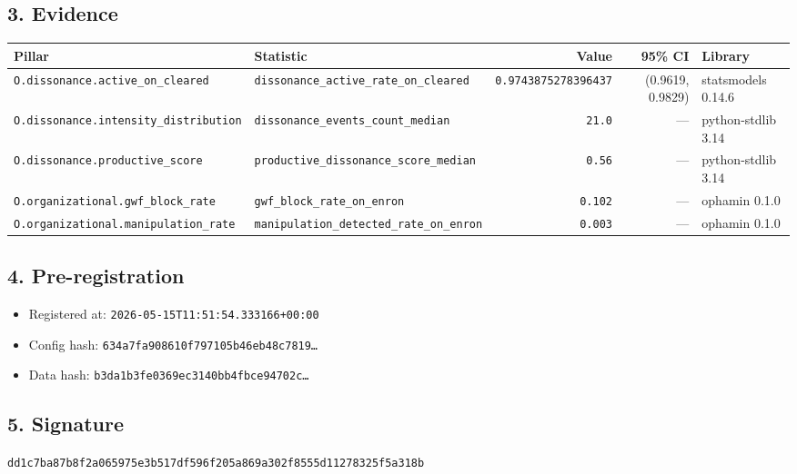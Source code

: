 \documentclass{article}
\begin{document}
\subsection*{3. Evidence}
\begin{tabular}{llrrl}\toprule
\textbf{Pillar} & \textbf{Statistic} & \textbf{Value} & \textbf{95\% CI} & \textbf{Library} \\\midrule
\texttt{O.dissonance.active\_on\_cleared} & \texttt{dissonance\_active\_rate\_on\_cleared} & \texttt{0.9743875278396437} & (0.9619, 0.9829) & statsmodels 0.14.6 \\
\texttt{O.dissonance.intensity\_distribution} & \texttt{dissonance\_events\_count\_median} & \texttt{21.0} & --- & python-stdlib 3.14 \\
\texttt{O.dissonance.productive\_score} & \texttt{productive\_dissonance\_score\_median} & \texttt{0.56} & --- & python-stdlib 3.14 \\
\texttt{O.organizational.gwf\_block\_rate} & \texttt{gwf\_block\_rate\_on\_enron} & \texttt{0.102} & --- & ophamin 0.1.0 \\
\texttt{O.organizational.manipulation\_rate} & \texttt{manipulation\_detected\_rate\_on\_enron} & \texttt{0.003} & --- & ophamin 0.1.0 \\
\bottomrule\end{tabular}
\subsection*{4. Pre-registration}
\begin{itemize}
\item Registered at: \texttt{2026-05-15T11:51:54.333166+00:00}
\item Config hash: \texttt{634a7fa908610f797105b46eb48c7819\dots}
\item Data hash: \texttt{b3da1b3fe0369ec3140bb4fbce94702c\dots}
\end{itemize}
\subsection*{5. Signature}
\texttt{dd1c7ba87b8f2a065975e3b517df596f205a869a302f8555d11278325f5a318b}\\
\end{document}
